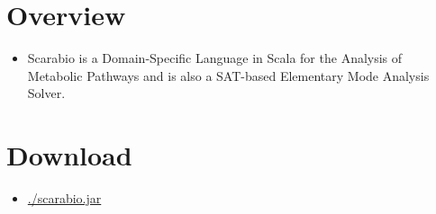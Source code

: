 \documentclass[compress,dvipdfmx]{beamer}
\author{Takehide Soh}
\date{\today}
\title{}
\begin{document}
\section*{Overview}
\label{sec-1}
\begin{itemize}
\item Scarabio is a Domain-Specific Language in Scala for the Analysis
of Metabolic Pathways and is also a SAT-based Elementary Mode
Analysis Solver.
\end{itemize}

\section*{Download}
\label{sec-2}
\begin{itemize}
\item \url{./scarabio.jar}
\end{itemize}
\end{document}
